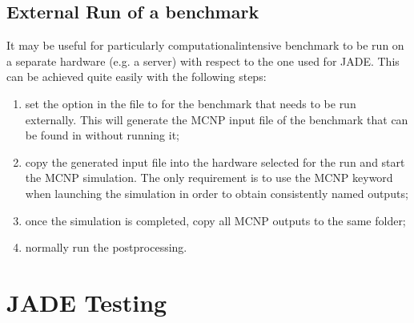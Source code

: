 \documentclass[letterpaper,10pt,english]{sphinxmanual}
\begin{document}
\section{External Run of a benchmark}
\label{\detokenize{usage/tipstricks:external-run-of-a-benchmark}}\label{\detokenize{usage/tipstricks:externalrun}}
It may be useful for particularly computational\sphinxhyphen{}intensive benchmark to be
run on a separate hardware (e.g. a server) with respect to the one used for JADE.
This can be achieved quite easily with the following steps:
\begin{enumerate}
%
\item {} 
set the  option in the 
file to  for the benchmark that needs to be run externally. This
will generate the MCNP input file of the benchmark that can be found in
without running it;

\item {} 
copy the generated input file into the hardware selected for the run and start the
MCNP simulation. The only requirement is to use the MCNP keyword  
when launching the simulation in order to obtain consistently named outputs;

\item {} 
once the simulation is completed, copy all MCNP outputs to the same
 folder;

\item {} 
normally run the post\sphinxhyphen{}processing.

\end{enumerate}


\chapter{JADE Testing}
\label{\detokenize{testing/testing:jade-testing}}\label{\detokenize{testing/testing::doc}}
\end{document}
